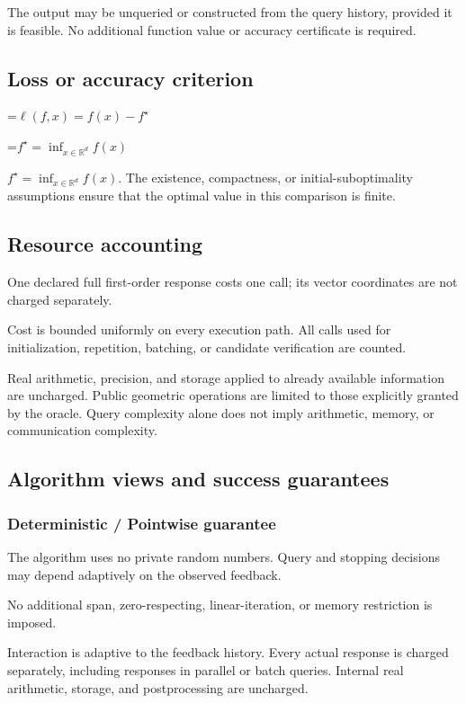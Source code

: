 \documentclass[10pt,a4paper]{article}
\newcommand{\AtlasMath}[1]{\par\begingroup\centering\setbox0=\hbox{$\displaystyle #1$}\ifdim\wd0>1.4\linewidth\typeout{ATLAS WIDE FORMULA: \the\wd0}\fi\ifdim\wd0>\linewidth\resizebox{\linewidth}{!}{\box0}\else\box0\fi\par\endgroup}
\newcommand{\AtlasInlineMath}[1]{\begingroup\setbox0=\hbox{$#1$}\ifdim\wd0>.4\linewidth\endgroup\AtlasMath{#1}\else\endgroup$#1$\fi}
\begin{document}
The output may be unqueried or constructed from the query history, provided it is feasible. No additional function value or accuracy certificate is required.

\subsection{Loss or accuracy criterion}

\AtlasMath{\ell(f,x)=f(x)-f^\star}


\AtlasInlineMath{f^\star=\inf_{x\in \mathbb{R}^d}f(x)}. The existence, compactness, or initial-suboptimality assumptions ensure that the optimal value in this comparison is finite.

\subsection{Resource accounting}
One declared full first-order response costs one call; its vector coordinates are not charged separately.

Cost is bounded uniformly on every execution path. All calls used for initialization, repetition, batching, or candidate verification are counted.

Real arithmetic, precision, and storage applied to already available information are uncharged. Public geometric operations are limited to those explicitly granted by the oracle. Query complexity alone does not imply arithmetic, memory, or communication complexity.

\subsection{Algorithm views and success guarantees}
\subsubsection{Deterministic / Pointwise guarantee}
The algorithm uses no private random numbers. Query and stopping decisions may depend adaptively on the observed feedback.

No additional span, zero-respecting, linear-iteration, or memory restriction is imposed.

Interaction is adaptive to the feedback history. Every actual response is charged separately, including responses in parallel or batch queries. Internal real arithmetic, storage, and postprocessing are uncharged.
\end{document}
